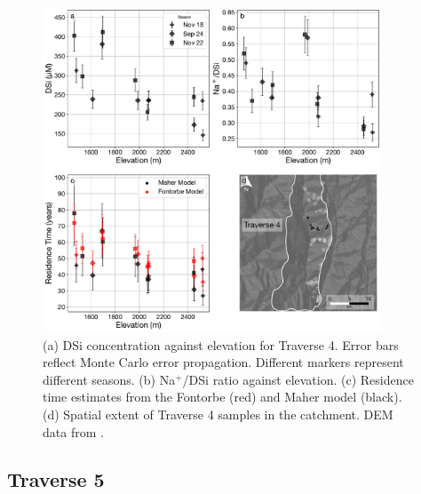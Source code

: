 \begin{figure}[h]
    \centering
        \includegraphics[width=0.9\textwidth]{Traverse_4_summary.pdf}
    \caption{(a) DSi concentration against elevation for Traverse 4. Error bars reflect Monte Carlo error propagation. Different markers represent different seasons. (b) Na$^+$/DSi ratio against elevation. (c) Residence time estimates from the Fontorbe (red) and Maher model (black). (d) Spatial extent of Traverse 4 samples in the catchment. DEM data from \textcite{asterGlobalDigitalElevation2018}.}
    \label{fig:trav4}
\end{figure}

\FloatBarrier



\subsection{Traverse 5}

